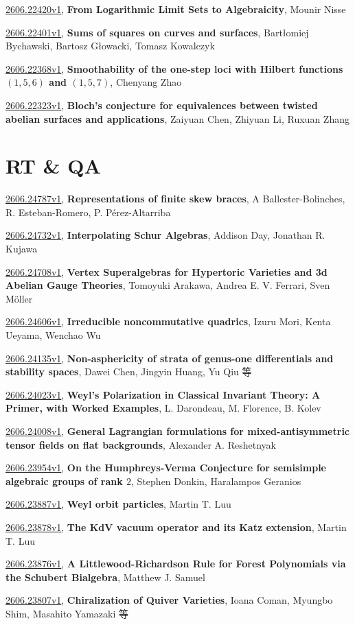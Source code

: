 \documentclass[9pt, a4paper]{article}
\theoremstyle{plain}
\theoremstyle{definition}
\theoremstyle{remark}
\newcommand{\arxiv}[3]{\href{https://arxiv.org/abs/#1}{#1}, \textbf{\textcolor{arxivblue}{#2}}, #3}
\begin{document}
\arxiv{2606.22420v1}{From Logarithmic Limit Sets to Algebraicity}{Mounir Nisse}

\arxiv{2606.22401v1}{Sums of squares on curves and surfaces}{Bartłomiej Bychawski, Bartosz Głowacki, Tomasz Kowalczyk}

\arxiv{2606.22368v1}{Smoothability of the one-step loci with Hilbert functions $(1,5,6)$ and $(1,5,7)$}{Chenyang Zhao}

\arxiv{2606.22323v1}{Bloch's conjecture for equivalences between twisted abelian surfaces and applications}{Zaiyuan Chen, Zhiyuan Li, Ruxuan Zhang}


\section{RT \& QA}
\arxiv{2606.24787v1}{Representations of finite skew braces}{A Ballester-Bolinches, R. Esteban-Romero, P. Pérez-Altarriba}

\arxiv{2606.24732v1}{Interpolating Schur Algebras}{Addison Day, Jonathan R. Kujawa}

\arxiv{2606.24708v1}{Vertex Superalgebras for Hypertoric Varieties and 3d Abelian Gauge Theories}{Tomoyuki Arakawa, Andrea E. V. Ferrari, Sven Möller}

\arxiv{2606.24606v1}{Irreducible noncommutative quadrics}{Izuru Mori, Kenta Ueyama, Wenchao Wu}

\arxiv{2606.24135v1}{Non-asphericity of strata of genus-one differentials and stability spaces}{Dawei Chen, Jingyin Huang, Yu Qiu 等}

\arxiv{2606.24023v1}{Weyl's Polarization in Classical Invariant Theory: A Primer, with Worked Examples}{L. Darondeau, M. Florence, B. Kolev}

\arxiv{2606.24008v1}{General Lagrangian formulations for mixed-antisymmetric tensor fields on flat backgrounds}{Alexander A. Reshetnyak}

\arxiv{2606.23954v1}{On the Humphreys-Verma Conjecture for semisimple algebraic groups of rank $2$}{Stephen Donkin, Haralampos Geranios}

\arxiv{2606.23887v1}{Weyl orbit particles}{Martin T. Luu}

\arxiv{2606.23878v1}{The KdV vacuum operator and its Katz extension}{Martin T. Luu}

\arxiv{2606.23876v1}{A Littlewood-Richardson Rule for Forest Polynomials via the Schubert Bialgebra}{Matthew J. Samuel}

\arxiv{2606.23807v1}{Chiralization of Quiver Varieties}{Ioana Coman, Myungbo Shim, Masahito Yamazaki 等}
\end{document}
